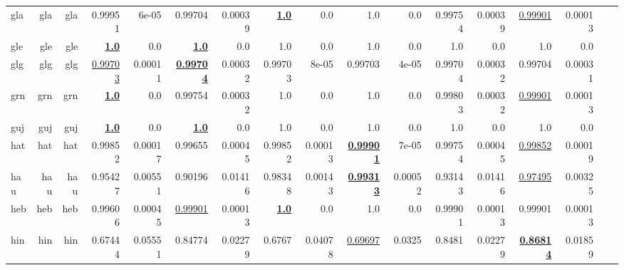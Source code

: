 \documentclass[11pt]{article}
\begin{document}
\begin{table*}[h]
{\begin{tabular}{lrrrrrrrrrrrrrrrr}
gla         & gla         & gla         & 0.99951         & 6e-05         & 0.99704         & 0.00039         & \textbf{\underline{1.0}}         & 0.0         & 1.0         & 0.0         & 0.99754         & 0.00039         & \underline{0.99901}         & 0.00013         \\
gle         & gle         & gle         & \textbf{\underline{1.0}}         & 0.0         & \textbf{\underline{1.0}}         & 0.0         & 1.0         & 0.0         & 1.0         & 0.0         & 1.0         & 0.0         & 1.0         & 0.0         \\
glg         & glg         & glg         & \underline{0.99703}         & 0.00011         & \textbf{\underline{0.99704}}         & 0.00032         & 0.99703         & 8e-05         & 0.99703         & 4e-05         & 0.99704         & 0.00032         & 0.99704         & 0.00031         \\
grn         & grn         & grn         & \textbf{\underline{1.0}}         & 0.0         & 0.99754         & 0.00032         & 1.0         & 0.0         & 1.0         & 0.0         & 0.99803         & 0.00032         & \underline{0.99901}         & 0.00013         \\
guj         & guj         & guj         & \textbf{\underline{1.0}}         & 0.0         & \textbf{\underline{1.0}}         & 0.0         & 1.0         & 0.0         & 1.0         & 0.0         & 1.0         & 0.0         & 1.0         & 0.0         \\
hat         & hat         & hat         & 0.99852         & 0.00017         & 0.99655         & 0.00045         & 0.99852         & 0.00013         & \textbf{\underline{0.99901}}         & 7e-05         & 0.99754         & 0.00045         & \underline{0.99852}         & 0.00019         \\
hau         & hau         & hau         & 0.95427         & 0.00551         & 0.90196         & 0.01416         & 0.98348         & 0.00143         & \textbf{\underline{0.99313}}         & 0.00052         & 0.93143         & 0.01416         & \underline{0.97495}         & 0.00325         \\
heb         & heb         & heb         & 0.99606         & 0.00045         & \underline{0.99901}         & 0.00013         & \textbf{\underline{1.0}}         & 0.0         & 1.0         & 0.0         & 0.99901         & 0.00013         & 0.99901         & 0.00013         \\
hin         & hin         & hin         & 0.67444         & 0.05551         & 0.84774         & 0.02279         & 0.6767         & 0.04078         & \underline{0.69697}         & 0.0325         & 0.8481         & 0.02279         & \textbf{\underline{0.86814}}         & 0.01859         \\

\end{tabular}}
\end{table*}
\end{document}
